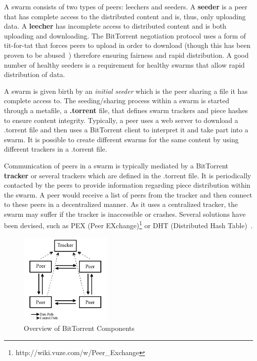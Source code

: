 A swarm consists of two types of peers: leechers and seeders. A
\textbf{seeder} is a peer that has complete access to the distributed content
and is, thus, only uploading data. A \textbf{leecher} has incomplete access to
distributed content and is both uploading and downloading. The BitTorrent
negotiation protocol uses a form of tit-for-tat that forces peers to upload in
order to download (though this has been proven to be
abused~\cite{free-riding}) therefore ensuring fairness and rapid distribution.
A good number of healthy seeders is a requirement for healthy swarms that
allow rapid distribution of data.

A swarm is given birth by an \textit{initial seeder} which is the peer sharing
a file it has complete access to. The seeding/sharing process within a swarm
is started through a metafile, a \textbf{.torrent} file, that defines swarm
trackers and piece hashes to ensure content integrity. Typically, a peer uses
a web server to download a .torrent file and then uses a BitTorrent client to
interpret it and take part into a swarm. It is possible to create different
swarms for the same content by using different trackers in a .torrent file.

Communication of peers in a swarm is typically mediated by a BitTorrent
\textbf{tracker} or several trackers which are defined in the .torrent file.
It is periodically contacted by the peers to provide information regarding
piece distribution within the swarm. A peer would receive a list of peers from
the tracker and then connect to these peers in a decentralized manner. As it
uses a centralized tracker, the swarm may suffer if the tracker is
inaccessible or crashes. Several solutions have been devised, such as PEX
(Peer EXchange)\footnote{http://wiki.vuze.com/w/Peer\_Exchange} or DHT (Distributed Hash Table)~\cite{dht-paper}.

\begin{figure}[htb]
  \begin{center}
    \includegraphics[width=0.4\textwidth]{src/img/p2p-systems/bittorrent-overview}
  \end{center}
  \caption{Overview of BitTorrent Components}
  \label{fig:p2p-systems:bittorrent-overview}
\end{figure}

